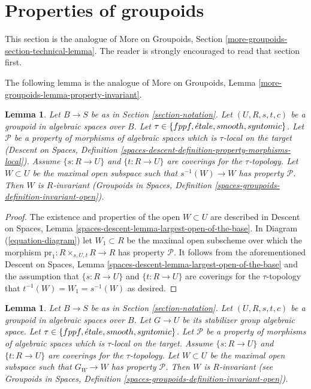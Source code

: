 \documentclass{stacks-project}
\theoremstyle{plain}
\newtheorem{lemma}[subsection]{Lemma}
\theoremstyle{definition}
\theoremstyle{remark}
\numberwithin{equation}{subsection}
\def\etale{{\acute{e}tale}}
\begin{document}
\section{Properties of groupoids}
\label{section-technical-lemma}

\noindent
This section is the analogue of
More on Groupoids, Section \ref{more-groupoids-section-technical-lemma}.
The reader is strongly encouraged to read that section first.

\medskip\noindent
The following lemma is the analogue of
More on Groupoids, Lemma \ref{more-groupoids-lemma-property-invariant}.

\begin{lemma}
\label{lemma-property-invariant}
Let $B \to S$ be as in Section \ref{section-notation}.
Let $(U, R, s, t, c)$ be a groupoid in algebraic spaces over $B$.
Let
$\tau \in \{fppf, \linebreak[0] \etale, \linebreak[0]
smooth, \linebreak[0] syntomic\}$.
Let $\mathcal{P}$ be a property of morphisms of algebraic spaces
which is $\tau$-local on the target
(Descent on Spaces,
Definition \ref{spaces-descent-definition-property-morphisms-local}).
Assume $\{s : R \to U\}$ and $\{t : R \to U\}$ are coverings for the
$\tau$-topology. Let $W \subset U$ be the maximal open subspace such that
$s^{-1}(W) \to W$ has property $\mathcal{P}$.
Then $W$ is $R$-invariant
(Groupoids in Spaces,
Definition \ref{spaces-groupoids-definition-invariant-open}).
\end{lemma}

\begin{proof}
The existence and properties of the open $W \subset U$ are described in
Descent on Spaces, Lemma \ref{spaces-descent-lemma-largest-open-of-the-base}.
In
Diagram (\ref{equation-diagram})
let $W_1 \subset R$ be the maximal open subscheme over which the morphism
$\text{pr}_1 : R \times_{s, U, t} R \to R$ has property $\mathcal{P}$.
It follows from the aforementioned
Descent on Spaces, Lemma \ref{spaces-descent-lemma-largest-open-of-the-base}
and the assumption that $\{s : R \to U\}$ and $\{t : R \to U\}$ are coverings
for the $\tau$-topology that $t^{-1}(W) = W_1 = s^{-1}(W)$ as desired.
\end{proof}

\begin{lemma}
\label{lemma-property-G-invariant}
Let $B \to S$ be as in Section \ref{section-notation}.
Let $(U, R, s, t, c)$ be a groupoid in algebraic spaces over $B$.
Let $G \to U$ be its stabilizer group algebraic space.
Let
$\tau \in \{fppf, \linebreak[0] \etale, \linebreak[0]
smooth, \linebreak[0] syntomic\}$.
Let $\mathcal{P}$ be a property of morphisms of algebraic spaces
which is $\tau$-local on the target.
Assume $\{s : R \to U\}$ and $\{t : R \to U\}$ are coverings for the
$\tau$-topology. Let $W \subset U$ be the maximal open subspace such that
$G_W \to W$ has property $\mathcal{P}$.
Then $W$ is $R$-invariant (see
Groupoids in Spaces,
Definition \ref{spaces-groupoids-definition-invariant-open}).
\end{lemma}
\end{document}
